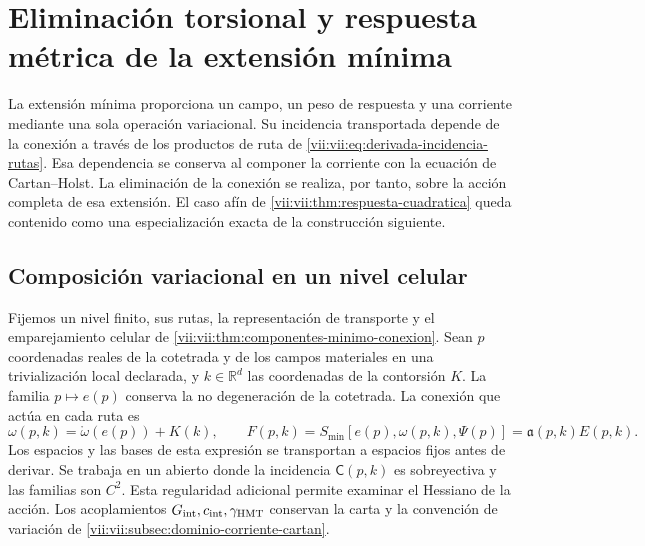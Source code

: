 
\section{Eliminación torsional y respuesta métrica de la extensión mínima}
\label{vii:vii:sec:eliminacion-torsional-no-lineal}

La extensión mínima proporciona un campo, un peso de respuesta y una
corriente mediante una sola operación variacional. Su incidencia
transportada depende de la conexión a través de los productos de ruta de
\eqref{vii:vii:eq:derivada-incidencia-rutas}. Esa dependencia se conserva al
componer la corriente con la ecuación de Cartan--Holst. La eliminación
de la conexión se realiza, por tanto, sobre la acción completa de esa
extensión. El caso afín de
\ref{vii:vii:thm:respuesta-cuadratica} queda contenido como una
especialización exacta de la construcción siguiente.

\subsection{Composición variacional en un nivel celular}
\label{vii:vii:subsec:composicion-torsional-celular}

Fijemos un nivel finito, sus rutas, la representación de transporte y
el emparejamiento celular de
\ref{vii:vii:thm:componentes-minimo-conexion}. Sean \(p\) coordenadas
reales de la cotetrada y de los campos materiales en una trivialización
local declarada, y \(k\in\mathbb R^d\) las coordenadas de la
contorsión \(K\). La familia \(p\mapsto e(p)\) conserva la
no degeneración de la cotetrada. La conexión que actúa en cada ruta es
\begin{equation}
 \omega(p,k)=\mathring\omega(e(p))+K(k),\qquad
 F(p,k)=S_{\min}[e(p),\omega(p,k),\Psi(p)]
       =\mathfrak a(p,k)E(p,k).
 \label{vii:vii:eq:accion-minima-en-contorsion}
\end{equation}
Los espacios y las bases de esta expresión se transportan a espacios
fijos antes de derivar. Se trabaja en un abierto donde la incidencia
\(\mathsf C(p,k)\) es sobreyectiva y las familias son \(C^2\).
Esta regularidad adicional permite examinar el Hessiano de la acción.
Los acoplamientos \(G_{\rm int},c_{\rm int},\gamma_{\rm HMT}\)
conservan la carta y la convención de variación de
\ref{vii:vii:subsec:dominio-corriente-cartan}.

